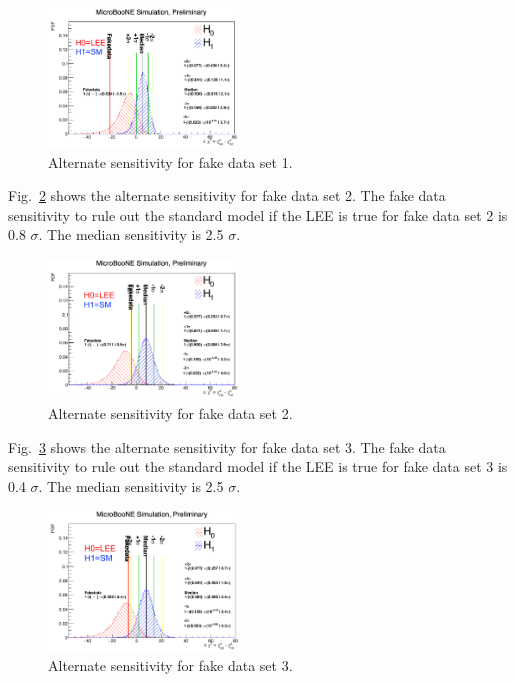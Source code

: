 \begin{figure}[H]
\begin{center}
\includegraphics[width=0.45\textwidth]{Fakedata/appendix/altsens_fd1.pdf}
\caption{\label{fig:fda:altsens_fd1} Alternate sensitivity for fake data set 1.}
\end{center}
\end{figure}

Fig.~\ref{fig:fda:altsens_fd2} shows the alternate sensitivity for fake data set 2. The fake data sensitivity to  rule out the standard model if the LEE is true for fake data set 2 is 0.8 $\sigma$. The median sensitivity is 2.5 $\sigma$. 

\begin{figure}[H]
\begin{center}
\includegraphics[width=0.45\textwidth]{Fakedata/appendix/altsens_fd2.pdf}
\caption{\label{fig:fda:altsens_fd2} Alternate sensitivity for fake data set 2.}
\end{center}
\end{figure}

Fig.~\ref{fig:fda:altsens_fd3} shows the alternate sensitivity for fake data set 3. The fake data sensitivity to  rule out the standard model if the LEE is true for fake data set 3 is 0.4 $\sigma$. The median sensitivity is 2.5 $\sigma$. 

\begin{figure}[H]
\begin{center}
\includegraphics[width=0.45\textwidth]{Fakedata/appendix/altsens_fd3.pdf}
\caption{\label{fig:fda:altsens_fd3} Alternate sensitivity for fake data set 3.}
\end{center}
\end{figure}

